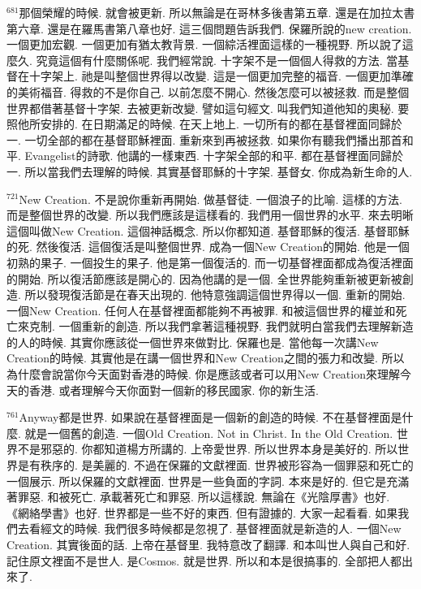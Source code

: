 \documentclass{book}
\begin{document}
$^{681}$那個榮耀的時候.
就會被更新.
所以無論是在哥林多後書第五章.
還是在加拉太書第六章.
還是在羅馬書第八章也好.
這三個問題告訴我們.
保羅所說的new creation.
一個更加宏觀.
一個更加有猶太教背景.
一個綜活裡面這樣的一種視野.
所以說了這麼久.
究竟這個有什麼關係呢.
我們經常說.
十字架不是一個個人得救的方法.
當基督在十字架上.
祂是叫整個世界得以改變.
這是一個更加完整的福音.
一個更加準確的美術福音.
得救的不是你自己.
以前怎麼不開心.
然後怎麼可以被拯救.
而是整個世界都借著基督十字架.
去被更新改變.
譬如這句經文.
叫我們知道他知的奧秘.
要照他所安排的.
在日期滿足的時候.
在天上地上.
一切所有的都在基督裡面同歸於一.
一切全部的都在基督耶穌裡面.
重新來到再被拯救.
如果你有聽我們播出那首和平.
Evangelist的詩歌.
他講的一樣東西.
十字架全部的和平.
都在基督裡面同歸於一.
所以當我們去理解的時候.
其實基督耶穌的十字架.
基督女.
你成為新生命的人.

$^{721}$New Creation.
不是說你重新再開始.
做基督徒.
一個浪子的比喻.
這樣的方法.
而是整個世界的改變.
所以我們應該是這樣看的.
我們用一個世界的水平.
來去明晰這個叫做New Creation.
這個神話概念.
所以你都知道.
基督耶穌的復活.
基督耶穌的死.
然後復活.
這個復活是叫整個世界.
成為一個New Creation的開始.
他是一個初熟的果子.
一個投生的果子.
他是第一個復活的.
而一切基督裡面都成為復活裡面的開始.
所以復活節應該是開心的.
因為他講的是一個.
全世界能夠重新被更新被創造.
所以發現復活節是在春天出現的.
他特意強調這個世界得以一個.
重新的開始.
一個New Creation.
任何人在基督裡面都能夠不再被罪.
和被這個世界的權並和死亡來克制.
一個重新的創造.
所以我們拿著這種視野.
我們就明白當我們去理解新造的人的時候.
其實你應該從一個世界來做對比.
保羅也是.
當他每一次講New Creation的時候.
其實他是在講一個世界和New Creation之間的張力和改變.
所以為什麼會說當你今天面對香港的時候.
你是應該或者可以用New Creation來理解今天的香港.
或者理解今天你面對一個新的移民國家.
你的新生活.

$^{761}$Anyway都是世界.
如果說在基督裡面是一個新的創造的時候.
不在基督裡面是什麼.
就是一個舊的創造.
一個Old Creation.
Not in Christ.
In the Old Creation.
世界不是邪惡的.
你都知道楊方所講的.
上帝愛世界.
所以世界本身是美好的.
所以世界是有秩序的.
是美麗的.
不過在保羅的文獻裡面.
世界被形容為一個罪惡和死亡的一個展示.
所以保羅的文獻裡面.
世界是一些負面的字詞.
本來是好的.
但它是充滿著罪惡.
和被死亡.
承載著死亡和罪惡.
所以這樣說.
無論在《光陰厚書》也好.
《網絡學書》也好.
世界都是一些不好的東西.
但有證據的.
大家一起看看.
如果我們去看經文的時候.
我們很多時候都是忽視了.
基督裡面就是新造的人.
一個New Creation.
其實後面的話.
上帝在基督里.
我特意改了翻譯.
和本叫世人與自己和好.
記住原文裡面不是世人.
是Cosmos.
就是世界.
所以和本是很搞事的.
全部把人都出來了.
\end{document}
